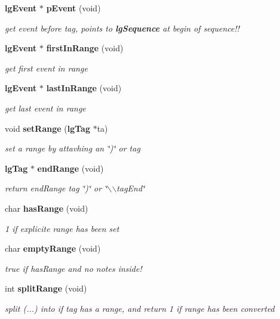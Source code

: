 \begin{CompactItemize}
{\bf lg\-Event} $\ast$ {\bf p\-Event} (void)
\begin{CompactList}\small\item\em get event before tag, points to {\bf lg\-Sequence} at begin of sequence!! \item\end{CompactList}\item 
{\bf lg\-Event} $\ast$ {\bf first\-In\-Range} (void)
\begin{CompactList}\small\item\em get first event in range \item\end{CompactList}\item 
{\bf lg\-Event} $\ast$ {\bf last\-In\-Range} (void)
\begin{CompactList}\small\item\em get last event in range \item\end{CompactList}\item 
void {\bf set\-Range} ({\bf lg\-Tag} $\ast$ta)
\begin{CompactList}\small\item\em set a range by attavhing an \char`\"{})\char`\"{} or  tag \item\end{CompactList}\item 
{\bf lg\-Tag} $\ast$ {\bf end\-Range} (void)
\begin{CompactList}\small\item\em return end\-Range tag \char`\"{})\char`\"{} or \char`\"{}$\backslash$$\backslash$tag\-End\char`\"{} \item\end{CompactList}\item 
char {\bf has\-Range} (void)
\begin{CompactList}\small\item\em 1 if explicite range has been set \item\end{CompactList}\item 
char {\bf empty\-Range} (void)
\begin{CompactList}\small\item\em true if has\-Range and no notes inside! \item\end{CompactList}\item 
int {\bf split\-Range} (void)
\begin{CompactList}\small\item\em split (...) into   if tag has a range, and return 1 if range has been converted \item\end{CompactList}\item 

\end{CompactItemize}
